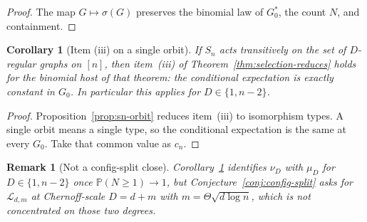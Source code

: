 \documentclass[11pt]{article}
\newtheorem{corollary}[theorem]{Corollary}
\newtheorem{remark}[theorem]{Remark}
\newcommand{\PP}{\mathbb{P}}
\begin{document}
\begin{proof}
The map \(G\mapsto\sigma(G)\) preserves the binomial law of \(G^*_0\), the count
\(N\), and containment.
\end{proof}

\begin{corollary}[Item (iii) on a single orbit]
\label{cor:iii-one-orbit}
If \(S_n\) acts transitively on the set of \(D\)-regular graphs on \([n]\), then
item~(iii) of Theorem~\ref{thm:selection-reduces} holds for the binomial host
of that theorem: the conditional expectation is exactly constant in \(G_0\).
In particular this applies for \(D\in\{1,n-2\}\).
\end{corollary}

\begin{proof}
Proposition~\ref{prop:sn-orbit} reduces item~(iii) to isomorphism types.
A single orbit means a single type, so the conditional expectation is the same
at every \(G_0\). Take that common value as \(c_n\).
\end{proof}

\begin{remark}[Not a config-split close]
\label{rem:iii-orbit-not-split}
Corollary~\ref{cor:iii-one-orbit} identifies \(\nu_D\) with \(\mu_D\) for
\(D\in\{1,n-2\}\) once \(\PP(N\ge 1)\to 1\), but
Conjecture~\ref{conj:config-split} asks for \(\mathcal{L}_{d,m}\) at
Chernoff-scale \(D=d+m\) with \(m=\Theta\sqrt{d\log n}\), which is not
concentrated on those two degrees.
\end{remark}
\end{document}
